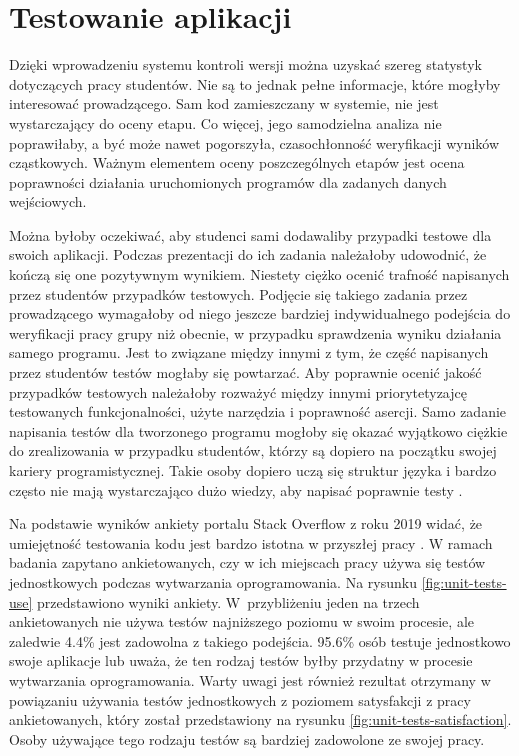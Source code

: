 \section{Testowanie aplikacji}
\label{programs-testing}

Dzięki wprowadzeniu systemu kontroli wersji można uzyskać szereg statystyk dotyczących pracy studentów.
Nie są to jednak pełne informacje, które mogłyby interesować prowadzącego.
Sam kod zamieszczany w systemie, nie jest wystarczający do oceny etapu.
Co więcej, jego samodzielna analiza nie poprawiłaby, a być może nawet pogorszyła, czasochłonność weryfikacji wyników cząstkowych.
Ważnym elementem oceny poszczególnych etapów jest ocena poprawności działania uruchomionych programów dla zadanych danych wejściowych.

Można byłoby oczekiwać, aby studenci sami dodawaliby przypadki testowe dla swoich aplikacji.
Podczas prezentacji do ich zadania należałoby udowodnić, że kończą się one pozytywnym wynikiem.
Niestety ciężko ocenić trafność napisanych przez studentów przypadków testowych.
Podjęcie się takiego zadania przez prowadzącego wymagałoby od niego jeszcze bardziej indywidualnego podejścia do weryfikacji pracy grupy niż obecnie, w przypadku sprawdzenia wyniku działania samego programu.
Jest to związane między innymi z tym, że część napisanych przez studentów testów mogłaby się powtarzać.
Aby poprawnie ocenić jakość przypadków testowych należałoby rozważyć  między innymi priorytetyzajcę testowanych funkcjonalności, użyte narzędzia i poprawność asercji.
Samo zadanie napisania testów dla tworzonego programu mogłoby się okazać wyjątkowo ciężkie do zrealizowania w przypadku studentów, którzy są dopiero na początku swojej kariery programistycznej.
Takie osoby dopiero uczą się struktur języka i bardzo często nie mają wystarczająco dużo wiedzy, aby napisać poprawnie testy \cite{tests-and-begginers}.

Na podstawie wyników ankiety portalu Stack Overflow z roku 2019 widać, że umiejętność testowania kodu jest bardzo istotna w przyszłej pracy \cite{stack-overflow-survey}.
W ramach badania zapytano ankietowanych, czy w ich miejscach pracy używa się testów jednostkowych podczas wytwarzania oprogramowania.
Na rysunku \ref{fig:unit-tests-use} przedstawiono wyniki ankiety.
W~przybliżeniu jeden na trzech ankietowanych nie używa testów najniższego poziomu w swoim procesie, ale zaledwie 4.4\% jest zadowolna z takiego podejścia.
95.6\% osób testuje jednostkowo swoje aplikacje lub uważa, że ten rodzaj testów byłby przydatny w procesie wytwarzania oprogramowania. 
Warty uwagi jest również rezultat otrzymany w powiązaniu używania testów jednostkowych z poziomem satysfakcji z pracy ankietowanych, który został przedstawiony na rysunku \ref{fig:unit-tests-satisfaction}.
Osoby używające tego rodzaju testów są bardziej zadowolone ze swojej pracy.

